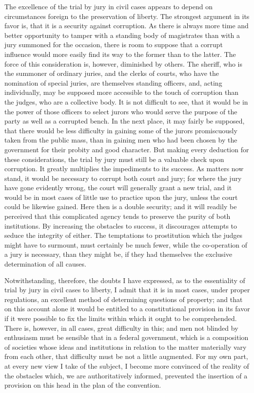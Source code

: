 The excellence of the trial by jury in civil cases appears to depend on circumstances foreign to the preservation of liberty. The strongest argument in its favor is, that it is a security against corruption. As there is always more time and better opportunity to tamper with a standing body of magistrates than with a jury summoned for the occasion, there is room to suppose that a corrupt influence would more easily find its way to the former than to the latter. The force of this consideration is, however, diminished by others. The sheriff, who is the summoner of ordinary juries, and the clerks of courts, who have the nomination of special juries, are themselves standing officers, and, acting individually, may be supposed more accessible to the touch of corruption than the judges, who are a collective body. It is not difficult to see, that it would be in the power of those officers to select jurors who would serve the purpose of the party as well as a corrupted bench. In the next place, it may fairly be supposed, that there would be less difficulty in gaining some of the jurors promiscuously taken from the public mass, than in gaining men who had been chosen by the government for their probity and good character. But making every deduction for these considerations, the trial by jury must still be a valuable check upon corruption. It greatly multiplies the impediments to its success. As matters now stand, it would be necessary to corrupt both court and jury; for where the jury have gone evidently wrong, the court will generally grant a new trial, and it would be in most cases of little use to practice upon the jury, unless the court could be likewise gained. Here then is a double security; and it will readily be perceived that this complicated agency tends to preserve the purity of both institutions. By increasing the obstacles to success, it discourages attempts to seduce the integrity of either. The temptations to prostitution which the judges might have to surmount, must certainly be much fewer, while the co-operation of a jury is necessary, than they might be, if they had themselves the exclusive determination of all causes.

Notwithstanding, therefore, the doubts I have expressed, as to the essentiality of trial by jury in civil cases to liberty, I admit that it is in most cases, under proper regulations, an excellent method of determining questions of property; and that on this account alone it would be entitled to a constitutional provision in its favor if it were possible to fix the limits within which it ought to be comprehended. There is, however, in all cases, great difficulty in this; and men not blinded by enthusiasm must be sensible that in a federal government, which is a composition of societies whose ideas and institutions in relation to the matter materially vary from each other, that difficulty must be not a little augmented. For my own part, at every new view I take of the subject, I become more convinced of the reality of the obstacles which, we are authoritatively informed, prevented the insertion of a provision on this head in the plan of the convention.

